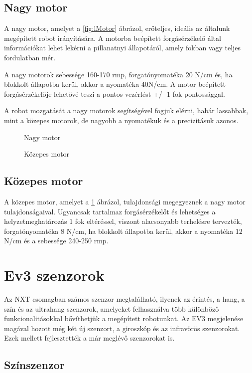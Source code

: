 \subsection{Nagy motor}
A nagy motor, amelyet a \ref{fig:lMotor} ábrázol, erőteljes, ideális az általunk megépített robot irányítására. A motorba beépített forgásérzékelő által  információkat lehet lekérni a pillanatnyi állapotáról, amely fokban vagy teljes fordulatban mér.

A nagy motorok sebessége 160-170 rmp, forgatónyomatéka 20 N/cm és, ha blokkolt állapotba kerül, akkor a nyomatéka 40N/cm. A motor beépített forgásérzékelője lehetővé teszi a pontos vezérlést +/- 1 fok pontossággal.

A robot mozgatását a nagy motorok segítségével fogjuk elérni, habár lassabbak, mint a közepes motorok, de nagyobb a nyomatékuk és a precizitásuk azonos.

\begin{figure}[!htb]
	\centering
	\caption{Nagy motor}
	\label{fig:lMotor}
	\endminipage
	\caption{Közepes motor}
	\label{fig:mMotor}
	\endminipage
\end{figure}

\subsection{Közepes motor}
A közepes motor, amelyet a \ref{fig:mMotor} ábrázol, tulajdonsági megegyeznek a nagy motor tulajdonságaival. Ugyancsak tartalmaz forgásérzékelőt és lehetséges a helyzetmeghatározás 1 fok eltéréssel, viszont alacsonyabb terhelésre tervezték, forgatónyomatéka 8 N/cm, ha blokkolt állapotba kerül, akkor a nyomatéka 12 N/cm és a sebessége 240-250 rmp.

\section{Ev3 szenzorok}\label{sec:ROBOT:szenzorok}

Az NXT csomagban számos szenzor megtalálható, ilyenek az érintés, a hang, a szín és az ultrahang szenzorok, amelyeket felhasználva több különböző funkcionalitásokkal bővíthetjük a megépített robotunkat. Az EV3 megjelenése magával hozott még két új szenzort, a giroszkóp és az infravörös szenzorokat. Ezek mellett fejlesztették a már meglévő szenzorokat is.

\subsection{Színszenzor}

